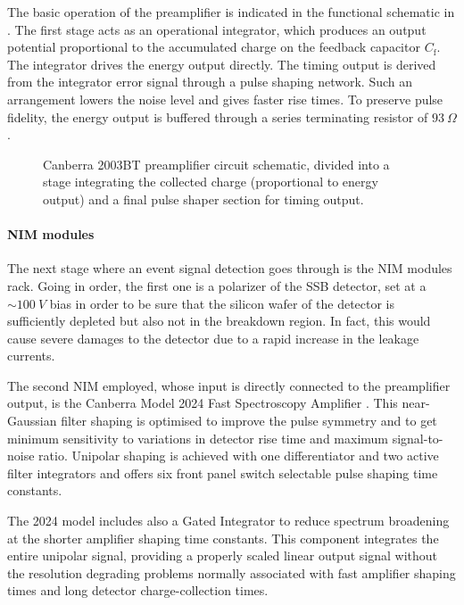 \documentclass[../../main/main.tex]{subfiles}
\begin{document}
The basic operation of the preamplifier is indicated in the functional schematic in . The first stage acts as an operational integrator, which produces an output potential proportional to the accumulated charge on the feedback capacitor \( C_{\mathrm{f}} \).
The integrator drives the energy output directly. The timing output is derived from the integrator error signal through a pulse shaping network. Such an arrangement lowers the noise level and gives faster rise times.
To preserve pulse fidelity, the energy output is buffered through a series terminating resistor of \( 93 \ \si{\Omega} \).


\begin{figure}[h]
    \centering
    
    \caption{Canberra 2003BT preamplifier circuit schematic, divided into a stage integrating the collected charge (proportional to energy output) and a final pulse shaper section for timing output.}
    \label{fig:canberra_circuit}
\end{figure}


\paragraph{NIM modules}
The next stage where an event signal detection goes through is the NIM modules rack. Going in order, the first one is a polarizer of the SSB detector, set at a \( \sim 100 \ \si{V} \) bias in order to be sure that the silicon wafer of the detector is sufficiently depleted but also not in the breakdown region. In fact, this would cause severe damages to the detector due to a rapid increase in the leakage currents.

The second NIM employed, whose input is directly connected to the preamplifier output, is the Canberra Model 2024 Fast Spectroscopy Amplifier \cite{canberra_2024}.
This near-Gaussian filter shaping is optimised to improve the pulse symmetry and to get minimum sensitivity to variations in detector rise time and maximum signal-to-noise ratio.
Unipolar shaping is achieved with one differentiator and two active filter integrators and offers six front panel switch selectable pulse shaping time constants.

The 2024 model includes also a Gated Integrator to reduce spectrum broadening at the shorter amplifier shaping time constants.
This component integrates the entire unipolar signal, providing a properly scaled linear output signal without the resolution degrading problems normally associated with fast amplifier shaping times and long detector charge-collection times.
\end{document}
